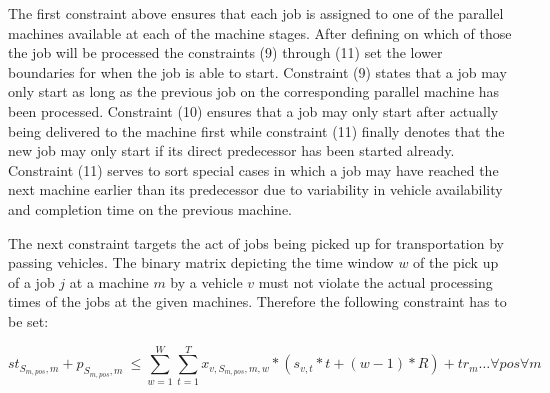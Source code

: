 The first constraint above ensures that each job is assigned to one of the parallel machines available at each of the machine stages. After defining
on which of those the job will be processed the constraints (9) through (11) set the lower boundaries for when the job is able to start. Constraint
(9) states that a job may only start as long as the previous job on the corresponding parallel machine has been processed. Constraint (10) ensures
that a job may only start after actually being delivered to the machine first while constraint (11) finally denotes that the new job may only start
if its direct predecessor has been started already. Constraint (11) serves to sort special cases in which a job may have reached the next machine
earlier than its predecessor due to variability in vehicle availability and completion time on the previous machine.

The next constraint targets the act of jobs being picked up for transportation by passing vehicles. The binary matrix depicting the
time window \(w\) of the pick up of a job \(j\) at a machine \(m\) by a vehicle \(v\) must not violate the actual processing times of the jobs at
the given machines. Therefore the following constraint has to be set:

\begin{equation}
  st_{S_{m,pos},m} + p_{S_{m,pos},m}\> \leq \sum_{w=1}^{W}\sum_{t=1}^{T} x_{v,S_{m,pos},m,w} * (s_{v,t} * t + (w-1) * R) + tr_{m} \ldots \forall pos \forall m
\end{equation}